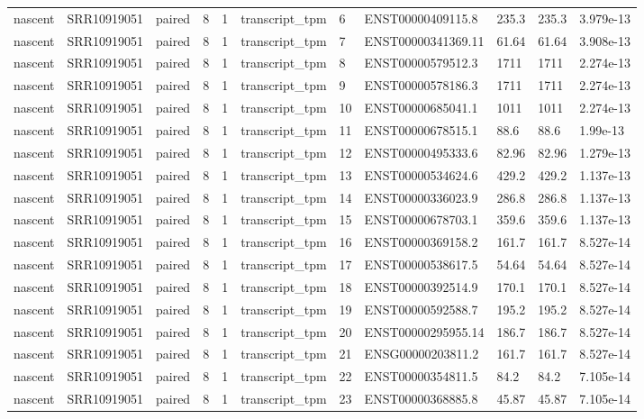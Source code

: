 \begin{tabular}{lllllllllll}
nascent & SRR10919051 & paired & 8 & 1 & transcript\_tpm & 6 & ENST00000409115.8 & 235.3 & 235.3 & 3.979e-13 \\
nascent & SRR10919051 & paired & 8 & 1 & transcript\_tpm & 7 & ENST00000341369.11 & 61.64 & 61.64 & 3.908e-13 \\
nascent & SRR10919051 & paired & 8 & 1 & transcript\_tpm & 8 & ENST00000579512.3 & 1711 & 1711 & 2.274e-13 \\
nascent & SRR10919051 & paired & 8 & 1 & transcript\_tpm & 9 & ENST00000578186.3 & 1711 & 1711 & 2.274e-13 \\
nascent & SRR10919051 & paired & 8 & 1 & transcript\_tpm & 10 & ENST00000685041.1 & 1011 & 1011 & 2.274e-13 \\
nascent & SRR10919051 & paired & 8 & 1 & transcript\_tpm & 11 & ENST00000678515.1 & 88.6 & 88.6 & 1.99e-13 \\
nascent & SRR10919051 & paired & 8 & 1 & transcript\_tpm & 12 & ENST00000495333.6 & 82.96 & 82.96 & 1.279e-13 \\
nascent & SRR10919051 & paired & 8 & 1 & transcript\_tpm & 13 & ENST00000534624.6 & 429.2 & 429.2 & 1.137e-13 \\
nascent & SRR10919051 & paired & 8 & 1 & transcript\_tpm & 14 & ENST00000336023.9 & 286.8 & 286.8 & 1.137e-13 \\
nascent & SRR10919051 & paired & 8 & 1 & transcript\_tpm & 15 & ENST00000678703.1 & 359.6 & 359.6 & 1.137e-13 \\
nascent & SRR10919051 & paired & 8 & 1 & transcript\_tpm & 16 & ENST00000369158.2 & 161.7 & 161.7 & 8.527e-14 \\
nascent & SRR10919051 & paired & 8 & 1 & transcript\_tpm & 17 & ENST00000538617.5 & 54.64 & 54.64 & 8.527e-14 \\
nascent & SRR10919051 & paired & 8 & 1 & transcript\_tpm & 18 & ENST00000392514.9 & 170.1 & 170.1 & 8.527e-14 \\
nascent & SRR10919051 & paired & 8 & 1 & transcript\_tpm & 19 & ENST00000592588.7 & 195.2 & 195.2 & 8.527e-14 \\
nascent & SRR10919051 & paired & 8 & 1 & transcript\_tpm & 20 & ENST00000295955.14 & 186.7 & 186.7 & 8.527e-14 \\
nascent & SRR10919051 & paired & 8 & 1 & transcript\_tpm & 21 & ENSG00000203811.2 & 161.7 & 161.7 & 8.527e-14 \\
nascent & SRR10919051 & paired & 8 & 1 & transcript\_tpm & 22 & ENST00000354811.5 & 84.2 & 84.2 & 7.105e-14 \\
nascent & SRR10919051 & paired & 8 & 1 & transcript\_tpm & 23 & ENST00000368885.8 & 45.87 & 45.87 & 7.105e-14 \\

\end{tabular}
